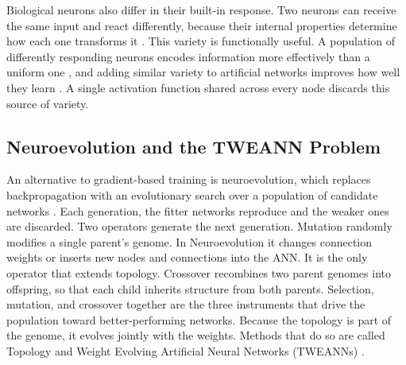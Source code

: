 \documentclass[12pt]{article}
\newcommand{\revGram}[2]{#2}
\begin{document}
Biological neurons also differ in their built-in response.
Two neurons can receive the same input and react differently, because their internal properties determine how each one transforms it \parencite{drion_ion_2015}.
This variety is functionally useful.
A population of differently responding neurons encodes information more effectively than a uniform one \parencite{tripathy_intermediate_2013}, and adding similar variety to artificial networks improves how well they learn \parencite{perez-nieves_neural_2021}.
A single activation function shared across every node discards this source of variety.



\subsection{Neuroevolution and the TWEANN Problem}
\label{subsec:neuroevolution}


An alternative to gradient-based training is neuroevolution, which replaces backpropagation with an evolutionary search over a population of candidate networks \parencite{stanley_designing_2019}.
Each generation, the fitter networks reproduce and the weaker ones are discarded.
Two operators generate the next generation.
Mutation randomly modifies a single parent's genome. In Neuroevolution it changes connection weights or inserts new nodes and connections into the ANN. It is the only operator that extends topology.
Crossover recombines two parent genomes into offspring, so that each child inherits structure from both parents.
Selection, mutation, and crossover together are \revGram{G-12}{the three instruments that drive the population} toward better-performing networks.
Because the topology is part of the genome, it evolves jointly with the weights. Methods that do so are called Topology and Weight Evolving Artificial Neural Networks (TWEANNs) \parencite{stanley_evolving_2002}.
\end{document}

